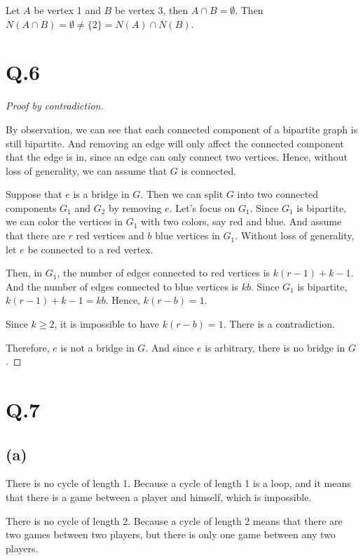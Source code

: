 \documentclass[a4paper,12pt]{article}
\begin{document}
Let $A$ be vertex 1 and $B$ be vertex 3, then $A \cap B = \emptyset$.
Then $N(A \cap B) = \emptyset \neq \{2\} = N(A) \cap N(B)$.

\section*{Q.6}

\begin{proof}[Proof by contradiction]
$ $

By observation, we can see that each connected component of a bipartite graph is still bipartite.
And removing an edge will only affect the connected component that the edge is in, since an edge can only connect two vertices.
Hence, without loss of generality, we can assume that $G$ is connected.

Suppose that $e$ is a bridge in $G$.
Then we can split $G$ into two connected components $G_1$ and $G_2$ by removing $e$.
Let's focus on $G_1$.
Since $G_1$ is bipartite, we can color the vertices in $G_1$ with two colors, say red and blue.
And assume that there are $r$ red vertices and $b$ blue vertices in $G_1$.
Without loss of generality, let $e$ be connected to a red vertex.

Then, in $G_1$, the number of edges connected to red vertices is $k(r-1) + k-1$.
And the number of edges connected to blue vertices is $kb$.
Since $G_1$ is bipartite, $k(r-1) + k-1 = kb$.
Hence, $k(r-b) = 1$.

Since $k \geq 2$, it is impossible to have $k(r-b) = 1$.
There is a contradiction.

Therefore, $e$ is not a bridge in $G$.
And since $e$ is arbitrary, there is no bridge in $G$.
\end{proof}

\section*{Q.7}

\subsection*{(a)}

There is no cycle of length 1. 
Because a cycle of length 1 is a loop, and it means that there is a game between a player and himself, which is impossible.

There is no cycle of length 2.
Because a cycle of length 2 means that there are two games between two players, but there is only one game between any two players.
\end{document}
